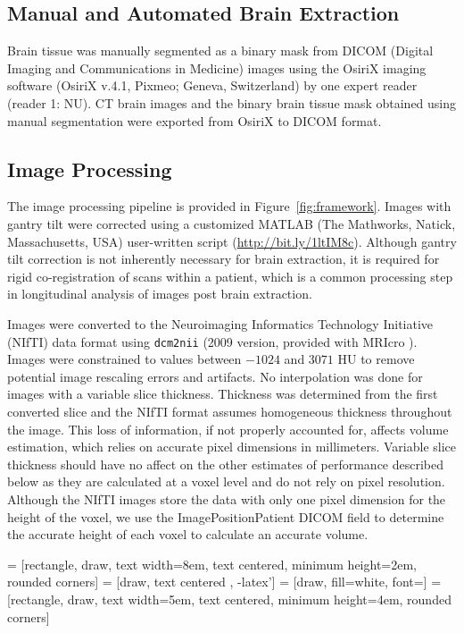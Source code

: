 \documentclass{elsarticle}\usepackage[]{graphicx}\usepackage[]{color}
\begin{document}


\subsection{Manual and Automated Brain Extraction}
Brain tissue was manually segmented as a binary mask from DICOM (Digital Imaging and Communications in Medicine) images using the OsiriX imaging software (OsiriX v.4.1, Pixmeo; Geneva, Switzerland) by one expert reader (reader 1: NU). 
CT brain images and the binary brain tissue mask obtained using manual segmentation were exported from OsiriX to DICOM format.  

\subsection{Image Processing}
The image processing pipeline is provided in Figure~\ref{fig:framework}.
Images with gantry tilt were corrected using a customized MATLAB (The Mathworks, Natick, Massachusetts, USA) user-written script (\url{http://bit.ly/1ltIM8c}).  Although gantry tilt correction is not inherently necessary for brain extraction, it is required for rigid co-registration of scans within a patient, which is a common processing step in longitudinal analysis of images post brain extraction. 

Images were converted to the Neuroimaging Informatics Technology Initiative (NIfTI) data format using \texttt{dcm2nii} (2009 version, provided with MRIcro \citep{rorden_stereotaxic_2000}).  Images were constrained to values between $-1024$ and $3071$ HU to remove potential image rescaling errors and artifacts.  No interpolation was done for images with a variable slice thickness. Thickness was determined from the first converted slice and the NIfTI format assumes homogeneous thickness throughout the image.  This loss of information, if not properly accounted for, affects volume estimation, which relies on accurate pixel dimensions in millimeters.  Variable slice thickness should have no affect on the other estimates of performance described below as they are calculated at a voxel level and do not rely on pixel resolution.  Although the NIfTI images store the data with only one pixel dimension for the height of the voxel, we use the ImagePositionPatient DICOM field to determine the accurate height of each voxel to calculate an accurate volume.  


 = [rectangle, draw, text width=8em, text centered, minimum height=2em, rounded corners]
 = [draw, text centered , -latex']
 = [draw, fill=white, font=\tiny ]
 = [rectangle, draw, text width=5em, text centered, minimum height=4em, rounded corners]    
\end{document}
